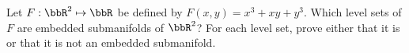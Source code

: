 Let $F:\bbR^2\mapsto \bbR$ be defined by $F(x,y) =x^3 + xy + y^3$.  Which level sets of $F$ are embedded submanifolds of $\bbR^2$? For each level set, prove either that it is or that it is not an embedded submanifold.